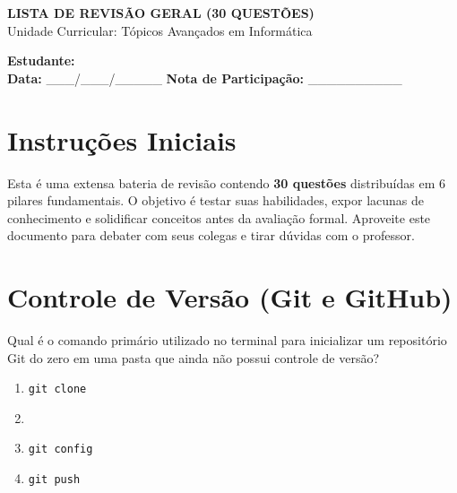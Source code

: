 \documentclass[12pt,a4paper]{article}
\newcommand{\correto}[1]{\iftoggle{gabarito}{\textbf{\color{corGabarito}#1}}{#1}}
\begin{document}
\begin{center}
    {\Large \textbf{LISTA DE REVISÃO GERAL (30 QUESTÕES)}}\\
    \vspace{0.2cm}
    Unidade Curricular: Tópicos Avançados em Informática\\
    \iftoggle{gabarito}{\textbf{\color{corGabarito}CHAVE DE RESPOSTAS / GABARITO}}{}
\end{center}

\vspace{0.5cm}

\begin{tcolorbox}[colback=white, colframe=black, boxrule=0.5pt, arc=0pt]
    \textbf{Estudante:} \hrulefill \\
    \vspace{0.3cm}
    \textbf{Data:} \_\_\_/\_\_\_/\_\_\_\_\_ \hspace{2cm} \textbf{Nota de Participação:} \_\_\_\_\_\_\_\_\_\_
\end{tcolorbox}

\vspace{0.5cm}

\section*{Instruções Iniciais}
Esta é uma extensa bateria de revisão contendo \textbf{30 questões} distribuídas em 6 pilares fundamentais. O objetivo é testar suas habilidades, expor lacunas de conhecimento e solidificar conceitos antes da avaliação formal. Aproveite este documento para debater com seus colegas e tirar dúvidas com o professor.

\vspace{0.5cm}

\section{Controle de Versão (Git e GitHub)}

\begin{tcolorbox}[colback=white, colframe=azulTitulo, title=Questão 1]
    Qual é o comando primário utilizado no terminal para inicializar um repositório Git do zero em uma pasta que ainda não possui controle de versão?
    \begin{enumerate}[label=\alph*)]
        \item \texttt{git clone}
        \item \correto{\texttt{git init}}
        \item \texttt{git config}
        \item \texttt{git push}
    \end{enumerate}
\end{tcolorbox}
\end{document}
